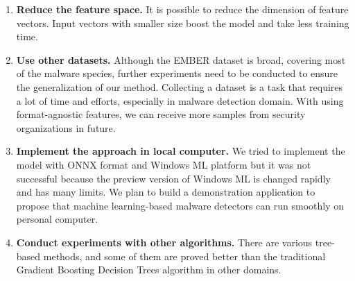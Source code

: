 \begin{enumerate}
    \item \textbf{Reduce the feature space. } It is possible to reduce the dimension of feature vectors. Input vectors with smaller size boost the model and take less training time. 
    \item \textbf{Use other datasets. } Although the EMBER dataset is broad, covering most of the malware species, further experiments need to be conducted to ensure the generalization of our method. Collecting a dataset is a task that requires a lot of time and efforts, especially in malware detection domain. With using format-agnostic features, we can receive more samples from security organizations in future. 
    \item \textbf{Implement the approach in local computer. } We tried to implement the model with ONNX format and Windows ML platform but it was not successful because the preview version of Windows ML is changed rapidly and has many limits. We plan to build a demonstration application to propose that machine learning-based malware detectors can run smoothly on personal computer.
    \item \textbf{Conduct experiments with other algorithms. } There are various tree-based methods, and some of them are proved better than the traditional Gradient Boosting Decision Trees algorithm in other domains.
    
\end{enumerate}

